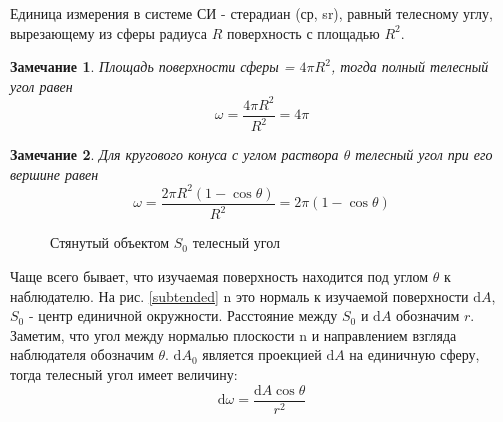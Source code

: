 \documentclass[12pt]{article}
\def\d{ \mathrm{d} }
\def\norm{ \mathrm{n} }
\newtheorem*{remark}{Замечание}
\begin{document}
Единица измерения в системе  СИ - стерадиан (ср, sr), равный телесному углу,
вырезающему из сферы радиуса $R$ поверхность с площадью $R^2$.

\begin{remark}
  Площадь поверхности сферы = $4\pi R^2$, тогда полный телесный угол равен
  $$\omega=\frac{4\pi R^2}{R^2}=4\pi$$
\end{remark}

\begin{remark}
  Для кругового конуса с углом раствора $\theta$ телесный угол при его вершине
  равен $$\omega=\frac{2\pi R^2(1-\cos\theta)}{R^2}=2\pi(1-\cos\theta)$$
\end{remark}

\begin{figure}
  \begin{center}
    \caption{Стянутый объектом $S_0$ телесный угол}
    \label{subtended}
  \end{center}
\end{figure}

Чаще всего бывает, что изучаемая поверхность находится под углом $\theta$
к наблюдателю. На рис. \eqref{subtended} $\norm$ это нормаль к
изучаемой поверхности $\d A$, $S_0$ - центр единичной окружности.
Расстояние между $S_0$ и $\d A$ обозначим $r$. Заметим, что угол между
нормалью плоскости $\norm$ и направлением взгляда наблюдателя обозначим $\theta$.
$\d A_0$ является проекцией $\d A$ на единичную сферу, тогда телесный угол имеет величину:
$$\d \omega = \frac{\d A\cos\theta}{r^2}$$
\end{document}
